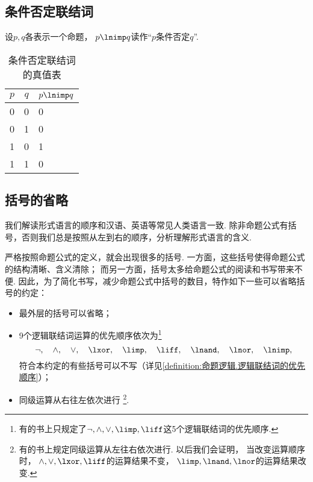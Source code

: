 \subsection{条件否定联结词}
设\(p,q\)各表示一个命题，
\(p \lnimp q\)读作“\(p\)条件否定\(q\)”.

\begin{table}[ht]
	\centering
	\begin{tabular}{|*{2}{c|}p{2cm}|}
		\hline
		\(p\) & \(q\) & \(p \lnimp q\) \\
		\hline
		0 & 0 & 0 \\
		0 & 1 & 0 \\
		1 & 0 & 1 \\
		1 & 1 & 0 \\
		\hline
	\end{tabular}
	\caption{条件否定联结词的真值表}
\end{table}

\subsection{括号的省略}
我们解读形式语言的顺序和汉语、英语等常见人类语言一致.
除非命题公式有括号，否则我们总是按照从左到右的顺序，分析理解形式语言的含义.

严格按照命题公式的定义，就会出现很多的括号.
一方面，这些括号使得命题公式的结构清晰、含义清除；
而另一方面，括号太多给命题公式的阅读和书写带来不便.
因此，为了简化书写，减少命题公式中括号的数目，特作如下一些可以省略括号的约定：\begin{itemize}
	\item 最外层的括号可以省略；
	\item 9个逻辑联结词运算的优先顺序依次为\footnote{
		有的书上只规定了\(\neg,\land,\lor,\limp,\liff\)这5个逻辑联结词的优先顺序.
	}\begin{equation*}
		\neg, \quad
		\land, \quad
		\lor, \quad
		\lxor, \quad
		\limp, \quad
		\liff, \quad
		\lnand, \quad
		\lnor, \quad
		\lnimp,
	\end{equation*}
	符合本约定的有些括号可以不写（详见\cref{definition:命题逻辑.逻辑联结词的优先顺序}）；
	\item 同级运算从右往左依次进行
	\footnote{
		有的书上规定同级运算从左往右依次进行.
		以后我们会证明，
		当改变运算顺序时，
		\(\land,\lor,\lxor,\liff\)的运算结果不变，
		\(\limp,\lnand,\lnor\)的运算结果改变.
	}.
\end{itemize}

